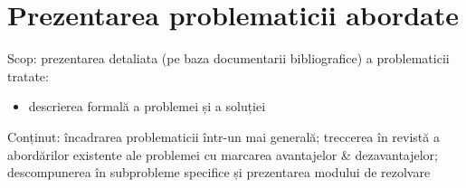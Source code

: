 \chapter{Prezentarea problematicii abordate}
Scop: prezentarea detaliata (pe baza documentarii bibliografice) a problematicii tratate:
\begin{itemize}
	\item descrierea formală a problemei și a soluției
\end{itemize}

Conținut: încadrarea problematicii într-un mai generală; treccerea în revistă a abordărilor existente ale problemei cu marcarea avantajelor \& dezavantajelor; descompunerea în subprobleme specifice și prezentarea modului de rezolvare